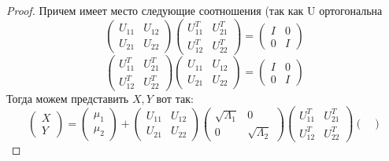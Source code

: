 \documentclass{article}
\begin{document}
\begin{claim}
\begin{proof}
        Причем имеет место следующие соотношения (так как U ортогональна
        $$
        \begin{pmatrix}
        U_{11} & U_{12}\\
        U_{21} & U_{22}
        \end{pmatrix} 
        \begin{pmatrix}
         U_{11}^T & U_{21}^T\\
        U_{12}^T & U_{22}^T
        \end{pmatrix}
        = 
        \begin{pmatrix}
        I & 0\\
        0 & I
        \end{pmatrix}
        $$
        $$
        \begin{pmatrix}
         U_{11}^T & U_{21}^T\\
        U_{12}^T & U_{22}^T
        \end{pmatrix}
        \begin{pmatrix}
        U_{11} & U_{12}\\
        U_{21} & U_{22}
        \end{pmatrix}
          = 
        \begin{pmatrix}
        I & 0\\
        0 & I
        \end{pmatrix}
        $$
        Тогда можем представить $X,Y$ вот так:
        $$
        \begin{pmatrix}
            X \\ Y
        \end{pmatrix}
        =
        \begin{pmatrix}
            \mu_1 \\ \mu_2
        \end{pmatrix}
        + 
        \begin{pmatrix}
        U_{11} & U_{12}\\
        U_{21} & U_{22}
        \end{pmatrix} 
        \begin{pmatrix}
        \sqrt{\Lambda_{1}} & 0\\
        0 & \sqrt{\Lambda_{2}}
        \end{pmatrix} 
        \begin{pmatrix}
         U_{11}^T & U_{21}^T\\
        U_{12}^T & U_{22}^T
        \end{pmatrix}
        \begin{pmatrix}

\end{pmatrix}$$
\end{proof}
\end{claim}
\end{document}
